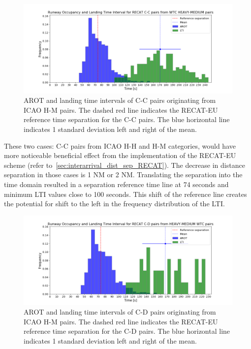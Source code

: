 \begin{figure}[h]
    \centering
    \includegraphics[width=1\textwidth]{graphics/fig_CC_from_HM_pairs_time_sep.png}
    \caption[AROT and LTI of C-C pairs originating from ICAO H-M pairs]{AROT and landing time intervals of C-C pairs originating from ICAO H-M pairs. The dashed red line indicates the RECAT-EU reference time separation for the C-C pairs. The blue horizontal line indicates 1 standard deviation left and right of the mean.}
    \label{fig:CC_from_HM_pairs_time_sep}
\end{figure}

These two cases: C-C pairs from ICAO H-H and H-M categories, would have more noticeable beneficial effect from the implementation of the RECAT-EU scheme (refer to~\ref{sec:interarrival_dist_sep_RECAT}). The decrease in distance separation in those cases is 1 NM or 2 NM. Translating the separation into the time domain resulted in a separation reference time line at 74 seconds and minimum LTI values close to 100 seconds. This shift of the reference line creates the potential for shift to the left in the frequency distribution of the LTI.
 
 \begin{figure}[h]
    \centering
    \includegraphics[width=1\textwidth]{graphics/fig_CD_from_HM_pairs_time_sep.png}
    \caption[AROT and LTI of C-D pairs originating from ICAO H-M pairs]{AROT and landing time intervals of C-D pairs originating from ICAO H-M pairs. The dashed red line indicates the RECAT-EU reference time separation for the C-D pairs. The blue horizontal line indicates 1 standard deviation left and right of the mean.}
    \label{fig:CD_from_HM_pairs_time_sep}
\end{figure}

